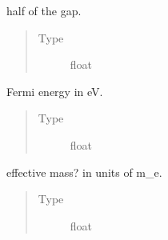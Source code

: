 \documentclass[letterpaper,10pt,english]{sphinxmanual}
\begin{document}
\begin{fulllineitems}
\begin{fulllineitems}
\begin{quote}
\begin{description}
\end{description}\end{quote}

\end{fulllineitems}


\begin{fulllineitems}
\label{\detokenize{code_structure:scdc.material.Material.Delta}}
half of the gap.
\begin{quote}\begin{description}
\item[{Type}] \leavevmode
float

\end{description}\end{quote}

\end{fulllineitems}


\begin{fulllineitems}
\label{\detokenize{code_structure:scdc.material.Material.E_F}}
Fermi energy in eV.
\begin{quote}\begin{description}
\item[{Type}] \leavevmode
float

\end{description}\end{quote}

\end{fulllineitems}


\begin{fulllineitems}
\label{\detokenize{code_structure:scdc.material.Material.m_star}}
effective mass? in units of m\_e.
\begin{quote}\begin{description}
\item[{Type}] \leavevmode
float

\end{description}\end{quote}


\end{fulllineitems}
\end{fulllineitems}
\end{document}
